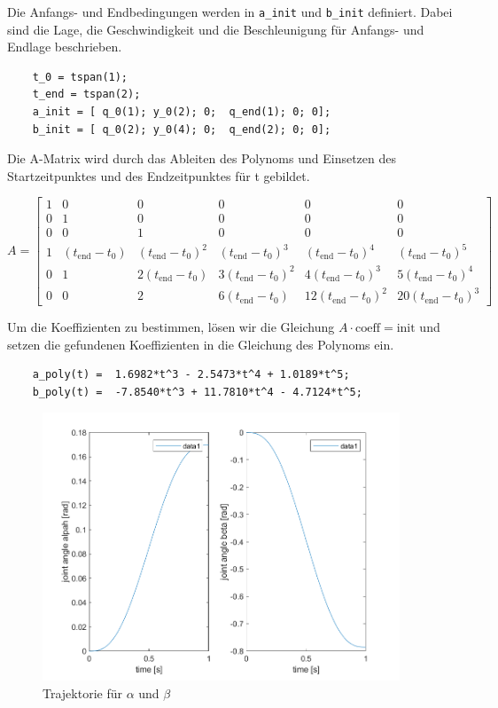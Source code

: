 Die Anfangs- und Endbedingungen werden in \texttt{a\_init} und \texttt{b\_init} definiert. Dabei sind die Lage, die Geschwindigkeit und die Beschleunigung für Anfangs- und Endlage beschrieben.

\begin{verbatim}
    t_0 = tspan(1);
    t_end = tspan(2);
    a_init = [ q_0(1); y_0(2); 0;  q_end(1); 0; 0];
    b_init = [ q_0(2); y_0(4); 0;  q_end(2); 0; 0];
\end{verbatim}


Die A-Matrix wird durch das Ableiten des Polynoms und Einsetzen des Startzeitpunktes und des Endzeitpunktes für t gebildet. 

\begin{equation*}
	A = \begin{bmatrix}
        1 & 0 & 0 & 0 & 0 & 0 \\
        0 & 1 & 0 & 0 & 0 & 0 \\
        0 & 0 & 1 & 0 & 0 & 0 \\
        1 & (t_{\text{end}} - t_0) & (t_{\text{end}} - t_0)^2 & (t_{\text{end}} - t_0)^3 & (t_{\text{end}} - t_0)^4 & (t_{\text{end}} - t_0)^5 \\
        0 & 1 & 2(t_{\text{end}} - t_0) & 3(t_{\text{end}} - t_0)^2 & 4(t_{\text{end}} - t_0)^3 & 5(t_{\text{end}} - t_0)^4 \\
        0 & 0 & 2 & 6(t_{\text{end}} - t_0) & 12(t_{\text{end}} - t_0)^2 & 20(t_{\text{end}} - t_0)^3
    \end{bmatrix}
\end{equation*}

Um die Koeffizienten zu bestimmen, lösen wir die Gleichung \(A \cdot \text{coeff} = \text{init}\) und setzen die gefundenen Koeffizienten in die Gleichung des Polynoms ein.

\begin{verbatim}
    a_poly(t) =  1.6982*t^3 - 2.5473*t^4 + 1.0189*t^5;
    b_poly(t) =  -7.8540*t^3 + 11.7810*t^4 - 4.7124*t^5;
\end{verbatim}


\begin{figure}[H]
	\centering
	\includegraphics[width=0.95\textwidth]{Trajektorie.png}
	\caption{Trajektorie für \(\alpha\) und \(\beta\) }
\end{figure}

